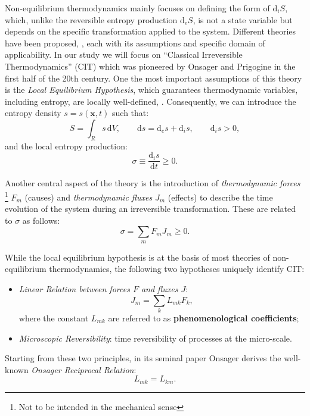 \documentclass[runningheads]{llncs}
\renewcommand{\d}{\ensuremath{\text{d}}}
\begin{document}
Non-equilibrium thermodynamics mainly focuses on defining the form of $\d_i S$, which, unlike the reversible entropy production $\d_e S$, is not a state variable but depends on the specific transformation applied to the system. 
Different theories have been proposed, \cite{NET}, each with its assumptions and specific domain of applicability. In our study we will focus on \textquotedblleft Classical Irreversible Thermodynamics'' (CIT) which was pioneered by Onsager \cite{onsager} and Prigogine \cite{prigogine} in the first half of the 20th century. One the most important assumptions of this theory is the \textit{Local Equilibrium Hypothesis}, which guarantees thermodynamic variables, including entropy, are locally well-defined, \cite{NET}. 
Consequently, we can introduce the entropy density $s=s(\mathbf{x},t)$ such that:
\begin{equation}
S = \int_{R} s \,\d V, \qquad \d s = \d_e s + \d_is, \qquad \d_is > 0, 
\end{equation}
and the local entropy production:
\begin{equation}
\sigma \equiv \frac{\d_i s}{\d t} \geq 0.
\end{equation}

Another central aspect of the theory is the introduction of \textit{thermodynamic forces} \footnote{Not to be intended in the mechanical sense} $F_m$ (causes) and \textit{thermodynamic fluxes} $J_m$ (effects) to describe the time evolution of the system during an irreversible transformation. These are related to $\sigma$ as follows:
\begin{equation}
\sigma = \sum_m F_m J_m\geq 0.
\label{2law}
\end{equation}

While the local equilibrium hypothesis is at the basis of most theories of non-equilibrium thermodynamics, the following two hypotheses uniquely identify CIT:
\begin{itemize}
	\item[1.] \textit{Linear Relation between forces $F$ and fluxes $J$}:
	\begin{equation}
	J_m = \sum_k L_{mk} F_k,\label{lin}
	\end{equation}
	where the constant $L_{mk}$ are referred to as \textbf{phenomenological coefficients};
	\item[2.] \textit{Microscopic Reversibility}: time reversibility of processes at the micro-scale. 
\end{itemize}

Starting from these two principles, in its seminal paper \cite{onsager} Onsager derives the well-known \textit{Onsager Reciprocal Relation}:
\begin{equation}
L_{mk}=L_{km}.
\end{equation}
\end{document}
